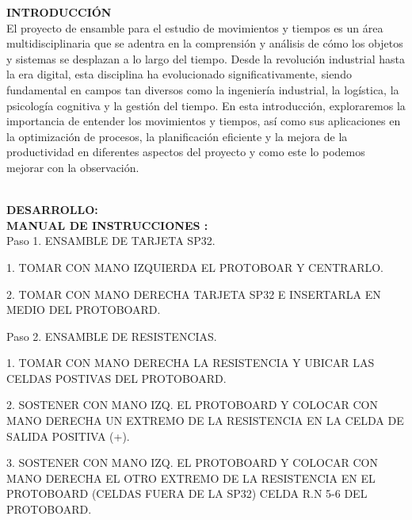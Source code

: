  
 \textbf{INTRODUCCIÓN }
 \\El proyecto de ensamble para el estudio de movimientos y tiempos es un área multidisciplinaria que se adentra en la comprensión y análisis de cómo los objetos y sistemas se desplazan a lo largo del tiempo. Desde la revolución industrial hasta la era digital, esta disciplina ha evolucionado significativamente, siendo fundamental en campos tan diversos como la ingeniería industrial, la logística, la psicología cognitiva y la gestión del tiempo. En esta introducción, exploraremos la importancia de entender los movimientos y tiempos, así como sus aplicaciones en la optimización de procesos, la planificación eficiente y la mejora de la productividad en diferentes aspectos del proyecto y como este lo podemos mejorar con la observación.
 
\\
\textbf{DESARROLLO:}\\
 \textbf{ MANUAL DE INSTRUCCIONES :} 
 \\Paso 1. ENSAMBLE DE TARJETA SP32.

1.	TOMAR CON MANO IZQUIERDA EL PROTOBOAR Y CENTRARLO.









2.	TOMAR CON MANO DERECHA TARJETA SP32 E INSERTARLA EN MEDIO DEL PROTOBOARD.















Paso 2. ENSAMBLE DE RESISTENCIAS.

1.	TOMAR CON MANO DERECHA LA RESISTENCIA Y UBICAR LAS CELDAS POSTIVAS DEL PROTOBOARD.







2.	SOSTENER CON MANO IZQ. EL PROTOBOARD Y COLOCAR CON MANO DERECHA UN EXTREMO DE LA RESISTENCIA EN LA CELDA DE SALIDA POSITIVA (+).








3.	SOSTENER CON MANO IZQ. EL PROTOBOARD Y COLOCAR CON MANO DERECHA EL OTRO EXTREMO DE LA RESISTENCIA EN EL PROTOBOARD (CELDAS FUERA DE LA SP32) CELDA R.N 5-6 DEL PROTOBOARD.



